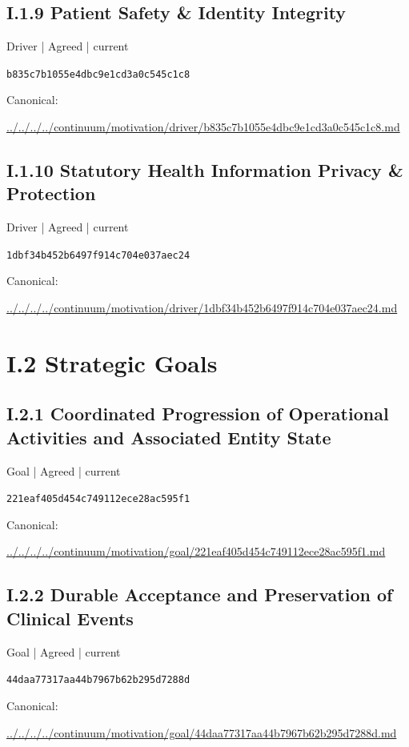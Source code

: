 \documentclass[10pt,a4paper]{article}
\begin{document}
\subsection*{I.1.9 Patient Safety \& Identity Integrity}
{\small Driver | Agreed | current}\par
\texttt{b835c7b1055e4dbc9e1cd3a0c545c1c8}\par
Canonical: \par
{\footnotesize\url{../../../../continuum/motivation/driver/b835c7b1055e4dbc9e1cd3a0c545c1c8.md}}\par
\subsection*{I.1.10 Statutory Health Information Privacy \& Protection}
{\small Driver | Agreed | current}\par
\texttt{1dbf34b452b6497f914c704e037aec24}\par
Canonical: \par
{\footnotesize\url{../../../../continuum/motivation/driver/1dbf34b452b6497f914c704e037aec24.md}}\par
\section*{I.2 Strategic Goals}
\subsection*{I.2.1 Coordinated Progression of Operational Activities and Associated Entity State}
{\small Goal | Agreed | current}\par
\texttt{221eaf405d454c749112ece28ac595f1}\par
Canonical: \par
{\footnotesize\url{../../../../continuum/motivation/goal/221eaf405d454c749112ece28ac595f1.md}}\par
\subsection*{I.2.2 Durable Acceptance and Preservation of Clinical Events}
{\small Goal | Agreed | current}\par
\texttt{44daa77317aa44b7967b62b295d7288d}\par
Canonical: \par
{\footnotesize\url{../../../../continuum/motivation/goal/44daa77317aa44b7967b62b295d7288d.md}}\par
\end{document}

